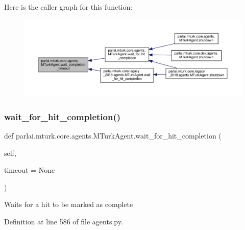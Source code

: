 Here is the caller graph for this function\+:
\nopagebreak
\begin{figure}[H]
\begin{center}
\leavevmode
\includegraphics[width=350pt]{classparlai_1_1mturk_1_1core_1_1agents_1_1MTurkAgent_a16eafd62a6d60317de9098405f786180_icgraph}
\end{center}
\end{figure}
\mbox{\label{classparlai_1_1mturk_1_1core_1_1agents_1_1MTurkAgent_a562fdfdb24a4e2274d45bd4a7aa7cfff}} 
\subsubsection{\texorpdfstring{wait\+\_\+for\+\_\+hit\+\_\+completion()}{wait\_for\_hit\_completion()}}
{\footnotesize\ttfamily def parlai.\+mturk.\+core.\+agents.\+M\+Turk\+Agent.\+wait\+\_\+for\+\_\+hit\+\_\+completion (\begin{DoxyParamCaption}\item[{}]{self,  }\item[{}]{timeout = {\ttfamily None} }\end{DoxyParamCaption})}

\begin{DoxyVerb}Waits for a hit to be marked as complete\end{DoxyVerb}
 

Definition at line 586 of file agents.\+py.



